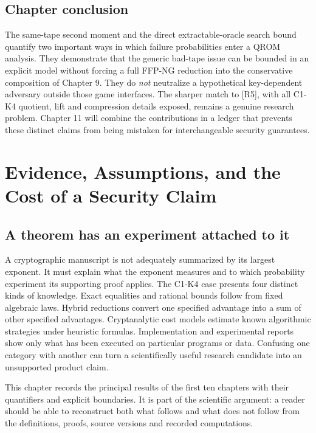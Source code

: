 \documentclass[
  11pt,
  a4paper,
  oneside]{report}
\begin{document}
\section{Chapter conclusion}\label{chapter-conclusion}

The same-tape second moment and the direct extractable-oracle search
bound quantify two important ways in which failure probabilities enter a
QROM analysis. They demonstrate that the generic bad-tape issue can be
bounded in an explicit model without forcing a full FFP-NG reduction
into the conservative composition of Chapter 9. They do \emph{not}
neutralize a hypothetical key-dependent adversary outside those game
interfaces. The sharper match to {[}R5{]}, with all C1-K4 quotient, lift
and compression details exposed, remains a genuine research problem.
Chapter 11 will combine the contributions in a ledger that prevents
these distinct claims from being mistaken for interchangeable security
guarantees.

\chapter{Evidence, Assumptions, and the Cost of a Security
Claim}\label{evidence-assumptions-and-the-cost-of-a-security-claim}

\section{A theorem has an experiment attached to
it}\label{a-theorem-has-an-experiment-attached-to-it}

A cryptographic manuscript is not adequately summarized by its largest
exponent. It must explain what the exponent measures and to which
probability experiment its supporting proof applies. The C1-K4 case
presents four distinct kinds of knowledge. Exact equalities and rational
bounds follow from fixed algebraic laws. Hybrid reductions convert one
specified advantage into a sum of other specified advantages.
Cryptanalytic cost models estimate known algorithmic strategies under
heuristic formulas. Implementation and experimental reports show only
what has been executed on particular programs or data. Confusing one
category with another can turn a scientifically useful research
candidate into an unsupported product claim.

This chapter records the principal results of the first ten chapters
with their quantifiers and explicit boundaries. It is part of the
scientific argument: a reader should be able to reconstruct both what
follows and what does not follow from the definitions, proofs, source
versions and recorded computations.
\end{document}
